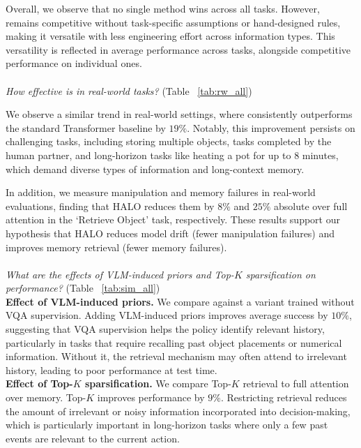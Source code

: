 Overall, we observe that no single method wins across all tasks. However,~\ourmethod{} remains competitive without task-specific assumptions or hand-designed rules, making it versatile with less engineering effort across information types. This versatility is reflected in average performance across tasks, alongside competitive performance on individual ones.
\\
\\
\textit{How effective is \ourmethod{} in real-world tasks?} (Table ~\ref{tab:rw_all})

We observe a similar trend in real-world settings, where \ourmethod{} consistently outperforms the standard Transformer baseline by $19\%$. Notably, this improvement persists on challenging tasks, including storing multiple objects, tasks completed by the human partner, and long-horizon tasks like heating a pot for up to 8 minutes, which demand diverse types of information and long-context memory.

In addition, we measure manipulation and memory failures in real-world evaluations, finding that HALO reduces them by $8\%$ and $25\%$ absolute over full attention in the `Retrieve Object' task, respectively. These results support our hypothesis that HALO reduces model drift (fewer manipulation failures) and improves memory retrieval (fewer memory failures).
\\
\\

\textit{What are the effects of VLM-induced priors and Top-$K$ sparsification on performance?} (Table ~\ref{tab:sim_all})
\vspace{0.5em}
\\
\textbf{Effect of VLM-induced priors.}
We compare \ourmethod{} against a variant trained without VQA supervision. Adding VLM-induced priors improves average success by $10\%$, suggesting that VQA supervision helps the policy identify relevant history, particularly in tasks that require recalling past object placements or numerical information. Without it, the retrieval mechanism may often attend to irrelevant history, leading to poor performance at test time.
\\
\textbf{Effect of Top-$K$ sparsification.}
We compare Top-$K$ retrieval to full attention over memory.
Top-$K$ improves performance by $9\%$.
Restricting retrieval reduces the amount of irrelevant or noisy information incorporated into decision-making, which is particularly important in long-horizon tasks where only a few past events are relevant to the current action.

